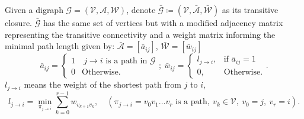 \begin{defn}
Given a digraph $\mathcal{G}=\left( {\mathcal V}, \mathcal{A}, \mathcal{W}\right)$, denote \(\bar{\mathcal G} \coloneqq \left({\mathcal V}, {\bar{\mathcal A}}, {\bar{\mathcal W}}\right)\) as its transitive closure.
\(\bar{\mathcal G}\) has the same set of vertices but with a modified adjacency matrix representing the transitive connectivity and a weight matrix informing the minimal path length given by:
\(\bar{\mathcal A} = [\bar{a}_{ij}]\), \(\bar{\mathcal W}= [\bar{w}_{ij}]\)
\[
\bar{a}_{ij} = \begin{cases}
1 & \ j \rightarrow i\text{ is a path in }\mathcal G\\
0 & \text{Otherwise}.
\end{cases};\ 
\bar{w}_{ij} = 
\begin{cases}
l_{j \to i}
, & \text{if } \bar{a}_{ij} = 1 \\
0, & \text{Otherwise.}
\end{cases}.
\]
\(l_{j \to i}\) means the weight of the shortest path from \(j\) to \(i\),
\[
l_{j\to i} = \min_{\pi_{j\to i}} \sum_{k = 0}^{r - 1} w_{v_{k+1} v_{k}},\quad \left(\pi_{j\to i} = v_0 v_1 \hdots v_r \text{ is a path},\ v_k \in \mathcal{V}, \ v_0 = j,\ v_r = i\right).
\]

\end{defn}
